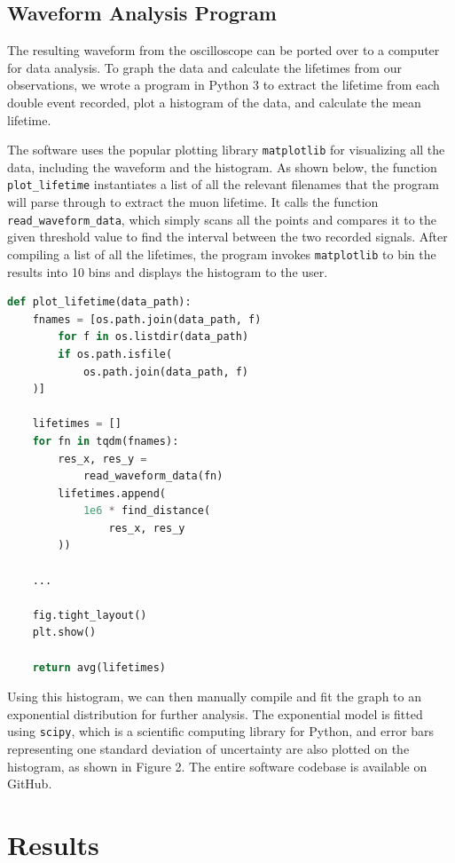 \documentclass[
 reprint,
 twocolumn,
 amsmath,amssymb,
 aps,
 pra,
 floatfix,
]{revtex4-1}
\begin{document}
\subsection{Waveform Analysis Program}

The resulting waveform from the oscilloscope can be ported over to a computer
for data analysis. To graph the data and calculate the lifetimes from our
observations, we wrote a program in Python 3 to extract the lifetime from each
double event recorded, plot a histogram of the data, and calculate the
mean lifetime.

The software uses the popular plotting library \verb|matplotlib| for visualizing
all the data, including the waveform and the histogram. As shown below, the
function \verb|plot_lifetime| instantiates a list of all the relevant filenames
that the program will parse through to extract the muon lifetime. It calls
the function \verb|read_waveform_data|, which simply scans all the points and
compares it to the given threshold value to find the interval between the two
recorded signals. After compiling a list of all the lifetimes, the program
invokes \verb|matplotlib| to bin the results into 10 bins and displays the
histogram to the user.

\begin{lstlisting}[language=Python]
def plot_lifetime(data_path):
    fnames = [os.path.join(data_path, f)
        for f in os.listdir(data_path)
        if os.path.isfile(
            os.path.join(data_path, f)
    )]

    lifetimes = []
    for fn in tqdm(fnames):
        res_x, res_y =
            read_waveform_data(fn)
        lifetimes.append(
            1e6 * find_distance(
                res_x, res_y
        ))
    
    ...

    fig.tight_layout()
    plt.show()

    return avg(lifetimes)
\end{lstlisting}

Using this histogram, we can then manually compile and fit the graph to an
exponential distribution for further analysis. The exponential model is fitted
using \verb|scipy|, which is a scientific computing library for Python, and
error bars representing one standard deviation of uncertainty are also plotted
on the histogram, as shown in Figure 2. The entire software codebase is
available on GitHub.\cite{Yu2020}

\section{Results}
\end{document}
